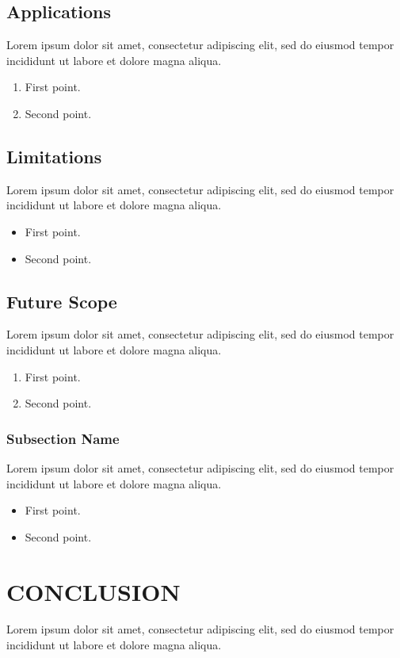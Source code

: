 \documentclass[12pt,a4paper]{report}
\begin{document}
\section{Applications}
Lorem ipsum dolor sit amet, consectetur adipiscing elit, sed do eiusmod tempor incididunt ut labore et dolore magna aliqua. 

\begin{enumerate}
\item First point.
\item Second point.
\end{enumerate}

\section{Limitations}
Lorem ipsum dolor sit amet, consectetur adipiscing elit, sed do eiusmod tempor incididunt ut labore et dolore magna aliqua. 

\begin{itemize}
\item First point.
\item Second point.
\end{itemize}

\section{Future Scope}
Lorem ipsum dolor sit amet, consectetur adipiscing elit, sed do eiusmod tempor incididunt ut labore et dolore magna aliqua. 

\begin{enumerate}
\item First point.
\item Second point.
\end{enumerate}

\subsection{Subsection Name}
Lorem ipsum dolor sit amet, consectetur adipiscing elit, sed do eiusmod tempor incididunt ut labore et dolore magna aliqua. 

\begin{itemize}
\item First point.
\item Second point.
\end{itemize}



\chapter{CONCLUSION}
\thispagestyle{empty}
Lorem ipsum dolor sit amet, consectetur adipiscing elit, sed do eiusmod tempor incididunt ut labore et dolore magna aliqua.\cite{JSM}  
\end{document}
